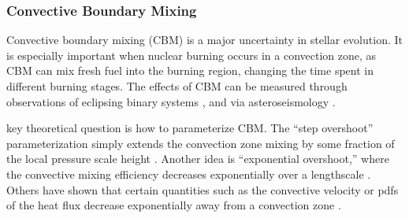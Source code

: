 {\color{purple}
\subsubsection{Convective Boundary Mixing}
}

Convective boundary mixing (CBM) is a major uncertainty in stellar evolution. It is especially important when nuclear burning occurs in a convection zone, as CBM can mix fresh fuel into the burning region, changing the time spent in different burning stages. The effects of CBM can be measured through observations of eclipsing binary systems \citep[e.g.,][]{Stancliffe_2015,claret:16,Valle_2016}, and via asteroseismology \citep[e.g.,][]{Constantino:2015,deheuvels:16,Ghasemi_2016}.

\A key theoretical question is how to parameterize CBM. The ``step overshoot'' parameterization simply extends the convection zone mixing by some fraction of the local pressure scale height \citep[e.g.,][]{Shaviv_1973}. Another idea is ``exponential overshoot,'' where the convective mixing efficiency decreases exponentially over a lengthscale \citep{Freytag1996}. Others have shown that certain quantities such as the convective velocity or pdfs of the heat flux decrease exponentially away from a convection zone \citep{Pratt_2017}.